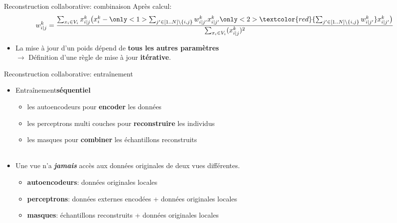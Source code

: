 \documentclass[hyperref={pdfpagelabels=false}]{beamer}
\begin{document}
    \begin{frame}{Reconstruction collaborative: combinaison}
        Après calcul:
        \begin{equation*}
            w_{i|j}^k = \frac{\sum_{x_i \in V_i} x_{i|j}^k\big(x_i^k - 
            \only<1>{\sum_{j'\in[1..N]\backslash \{i,j\}} w_{i|j'}^k x_{i|j'}^k}
            \only<2>{\textcolor{red}{\sum_{j'\in[1..N]\backslash \{i,j\}} w_{i|j'}^k} x_{i|j'}^k}
            \big)}{\sum_{x_i \in V_i}(x_{i|j}^k)^2}
        \end{equation*}
        \begin{itemize}
            \item<2> La mise à jour d'un poids dépend de \textbf{tous les autres 
                paramètres}\\$\rightarrow$ Définition d'une règle de mise à jour 
                \textbf{itérative}.
        \end{itemize}
    \end{frame}

    \begin{frame}{Reconstruction collaborative: entraînement}
        \begin{itemize}
            \item Entraînement\textbf{séquentiel}
                \begin{itemize}
                    \item les autoencodeurs pour \textbf{encoder} les données
                    \item les perceptrons multi couches pour 
                        \textbf{reconstruire} les individus
                    \item les masques pour \textbf{combiner} les échantillons 
                        reconstruits\\~\\
                \end{itemize}
            \item Une vue n'a \textbf{\textit{jamais}} accès aux données 
                originales de deux vues différentes.
                \begin{itemize}
                    \item \textbf{autoencodeurs}: données originales locales
                    \item \textbf{perceptrons}: données externes encodées + 
                        données originales locales
                    \item \textbf{masques}: échantillons reconstruits + données 
                        originales locales
                \end{itemize}
        \end{itemize}
    \end{frame}
\end{document}
